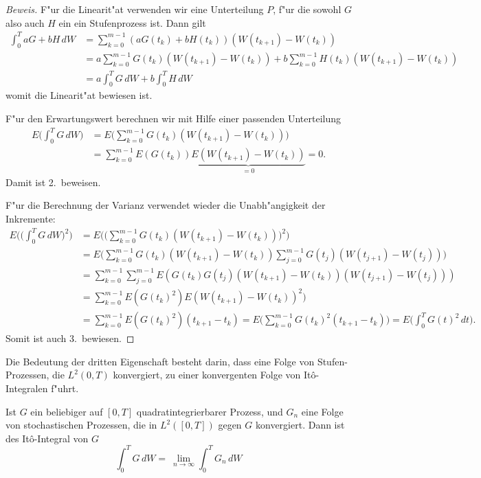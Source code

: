 \begin{proof}[Beweis]
F"ur die Linearit"at verwenden wir eine Unterteilung $P$, f"ur die sowohl
$G$ also auch $H$ ein ein Stufenprozess ist.
Dann gilt
\begin{align*}
\int_0^T aG+bH\,dW
&=
\sum_{k=0}^{m-1} (aG(t_k)+bH(t_k))(W(t_{k+1})-W(t_k))
\\
&=
a\sum_{k=0}^{m-1} G(t_k)(W(t_{k+1})-W(t_k))
+
b\sum_{k=0}^{m-1} H(t_k)(W(t_{k+1})-W(t_k))
\\
&=a\int_0^TG\,dW+b\int_0^TH\,dW
\end{align*}
womit die Linearit"at bewiesen ist.

F"ur den Erwartungswert berechnen wir mit Hilfe einer passenden Unterteilung
\begin{align*}
E\biggl(\int_0^T G\,dW\biggr)
&=
E\biggl(\sum_{k=0}^{m-1} G(t_k) (W(t_{k+1}) - W(t_k))\biggr)
\\
&=
\sum_{k=0}^{m-1} E(G(t_k)) \underbrace{E(W(t_{k+1}) - W(t_k))}_{=0}=0.
\end{align*}
Damit ist 2.~beweisen.

F"ur die Berechnung der Varianz verwendet wieder die Unabh"angigkeit der
Inkremente:
\begin{align*}
E\biggl(\biggl(\int_0^T G\,dW\biggr)^2\biggr)
&=
E\biggl(\biggl(\sum_{k=0}^{m-1}G(t_k)(W(t_{k+1})-W(t_k))\biggr)^2\biggr)
\\
&=
E\biggl(
\sum_{k=0}^{m-1}G(t_k)(W(t_{k+1})-W(t_k))
\sum_{j=0}^{m-1}G(t_j)(W(t_{j+1})-W(t_j))
\biggr)
\\
&=
\sum_{k=0}^{m-1}
\sum_{j=0}^{m-1}
E(G(t_k) G(t_j)
(W(t_{k+1})-W(t_k))
(W(t_{j+1})-W(t_j))
)
\\
&=
\sum_{k=0}^{m-1}
E(G(t_k)^2) E(W(t_{k+1})-W(t_k))^2)
\\
&=
\sum_{k=0}^{m-1}
E(G(t_k)^2) (t_{k+1}-t_k)
=
E\biggl(
\sum_{k=0}^{m-1}
G(t_k)^2 (t_{k+1}-t_k)
\biggr)
=E\biggl(\int_0^T G(t)^2\,dt\biggr).
\end{align*}
Somit ist auch 3.~bewiesen.
\end{proof}

Die Bedeutung der dritten Eigenschaft besteht darin, dass eine
Folge von Stufen-Prozessen, die $L^2(0,T)$ konvergiert, zu einer
konvergenten Folge von It\^o-Integralen f"uhrt.

\begin{definition}
Ist $G$ ein beliebiger auf $[0,T]$ quadratintegrierbarer Prozess,
und $G_n$ eine Folge von stochastischen Prozessen, die in $L^2([0,T])$
gegen $G$ konvergiert.
Dann ist des It\^o-Integral von $G$
\[
\int_0^T G\,dW
=
\
\lim_{n\to\infty} \int_0^T G_n\,dW
\]
\end{definition}

